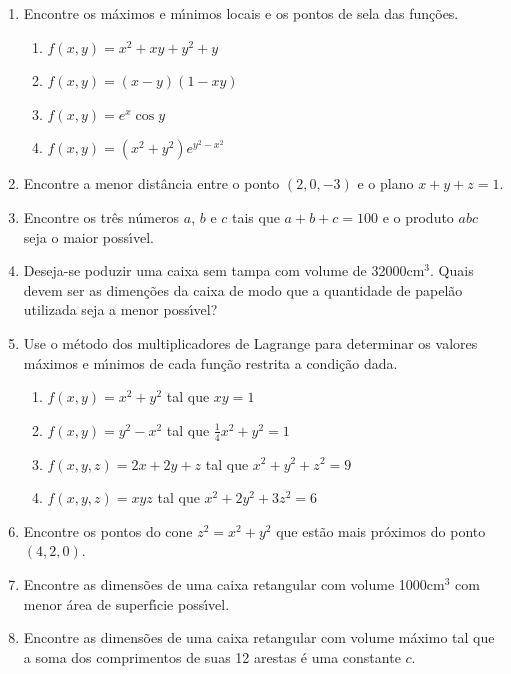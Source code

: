 \documentclass[a4paper,5pt]{amsbook}
\newcommand{\ds}{\displaystyle}
\begin{document}
\vspace{1cm}
\begin{enumerate}
    \setlength\itemsep{0.5cm}
    \item Encontre os m\'aximos e m\'{\i}nimos locais e os pontos de sela das fun\c{c}\~oes.
        \begin{enumerate}
            \item $f(x,y) = x^2+xy+y^2+y$
            \item $f(x,y) = (x-y)(1-xy)$
            \item $f(x,y) = e^x \cos{y}$
            \item $f(x,y) = (x^2+y^2)e^{y^2-x^2}$
        \end{enumerate}

    \item Encontre a menor dist\^ancia entre o ponto $(2,0,-3)$ e o plano
    $x+y+z=1$.

    \item Encontre os tr\^es n\'umeros $a$, $b$ e $c$ tais que $a+b+c=100$ e o
    produto $abc$ seja o maior poss\'{\i}vel.

    \item Deseja-se poduzir uma caixa sem tampa com volume de 32000cm$^3$.
    Quais devem ser as dimen\c{c}\~oes da caixa de modo que a quantidade de papel\~ao
    utilizada seja a menor poss\'{\i}vel?

    \item Use o m\'etodo dos multiplicadores de Lagrange para determinar os
    valores m\'aximos e m\'{\i}nimos de cada fun\c{c}\~ao restrita a condi\c{c}\~ao dada.
        \begin{enumerate}
            \setlength\itemsep{0.5cm}
            \item $f(x,y) = x^2+y^2$ tal que $xy=1$
            \item $f(x,y) = y^2-x^2$ tal que $\ds\frac{1}{4}x^2+y^2=1$
            \item $f(x,y,z) = 2x+2y+z$ tal que $x^2+y^2+z^2=9$
            \item $f(x,y,z) = xyz$ tal que $x^2+2y^2+3z^2=6$
        \end{enumerate}

    \item Encontre os pontos do cone $z^2=x^2+y^2$ que est\~ao mais pr\'oximos do
    ponto $(4,2,0)$.

    \item Encontre as dimens\~oes de uma caixa retangular com volume 1000cm$^3$
    com menor \'area de superf\'{\i}cie poss\'{\i}vel.

    \item Encontre as dimens\~oes de uma caixa retangular com volume m\'aximo tal
    que a soma dos comprimentos de suas 12 arestas \'e uma constante $c$.
\end{enumerate}
\end{document}
